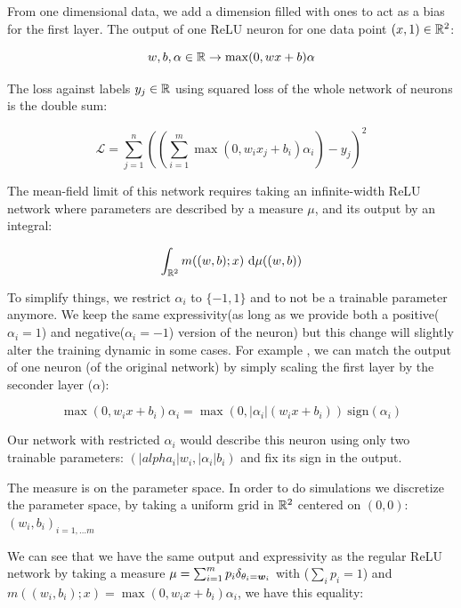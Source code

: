 From one dimensional data, we add a dimension filled with ones to act as a bias for the first layer. The output of one ReLU neuron for one data point $(x, 1) \in \mathbb{R}^2$:

\begin{equation}
	w, b, \alpha \in \mathbb{R} \rightarrow \max(0, w x + b) \alpha
\end{equation}

The loss against labels $y_j \in \mathbb{R}$ using squared loss of the whole network of neurons is the double sum:

\begin{equation}
	 \mathcal{L} = \sum_{j=1}^n \left(\left(\sum_{i=1}^m \max(0, w_i x_j + b_i) \alpha_i \right)  - y_j \right)^2
\end{equation}

The mean-field limit of this network requires taking an infinite-width ReLU network where parameters are described by a measure $\mu$, and its output by an integral:

\begin{equation}
	\int_{\mathbb{R}^2} m((w, b); x) ~ \mathrm{d} \mu((w, b))
\end{equation}
 
To simplify things, we restrict $\alpha_i$ to $\{-1, 1\}$ and to not be a trainable parameter anymore. We keep the same expressivity(as long as we provide both a positive($\alpha_i=1$) and negative($\alpha_i=-1$) version of the neuron) but this change will slightly alter the training dynamic in some cases. For example , we can match the output of one neuron (of the original network) by simply scaling the first layer by the seconder layer ($\alpha$):

\begin{equation}
	\max(0, w_i x + b_i) \alpha_i = \max\left(0, |\alpha_i|(w_i x + b_i)\right) \ \text{sign}(\alpha_i)
\end{equation}

Our network with restricted $\alpha_i$ would describe this neuron using only two trainable parameters: $(|alpha_i| w_i, |\alpha_i| b_i)$ and fix its sign in the output.

The measure is on the parameter space. In order to do simulations we discretize the parameter space, by taking a uniform grid in $\mathbb{R}^2$ centered on $(0, 0)$: $(w_i, b_i)_{i=1, \dots m}$

We can see that we have the same output and expressivity as the regular ReLU network by taking a measure $\mu = \sum_{i=1}^{m} p_i \delta_{\theta_i = {\bm{w}}_i}$ with ($\sum_i p_i=1$) and $m((w_i, b_i); x) = \max(0, w_i x + b_i) \alpha_i$, we have this equality:

